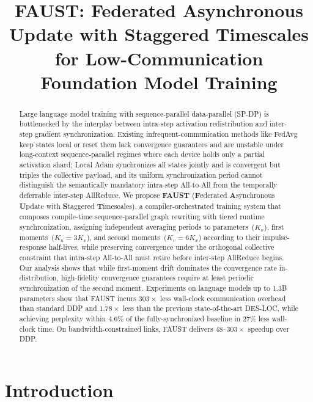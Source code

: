 \documentclass{article}
\title{FAUST: Federated Asynchronous Update with Staggered Timescales \\
for Low-Communication Foundation Model Training}
\author{}
\begin{document}
\maketitle

\begin{abstract}
Large language model training with sequence-parallel data-parallel (SP-DP) is bottlenecked by the interplay between intra-step activation redistribution and
inter-step gradient synchronization. Existing infrequent-communication methods like FedAvg keep states local or reset them lack convergence guarantees and
are unstable under long-context sequence-parallel regimes where each device holds only a partial activation shard; Local Adam synchronizes all states
jointly and is convergent but triples the collective payload, and its uniform synchronization period cannot distinguish the semantically mandatory intra-step All-to-All from the temporally deferrable inter-step AllReduce. We propose
\textbf{FAUST} (\textbf{F}ederated \textbf{A}synchronous \textbf{U}pdate with \textbf{S}taggered \textbf{T}imescales), a compiler-orchestrated training system that composes compile-time sequence-parallel graph rewriting with tiered runtime synchronization, assigning independent averaging periods to parameters~($K_x$), first moments~($K_u{=}3K_x$), and second moments~($K_v{=}6K_x$) according to their impulse-response half-lives, while preserving convergence under the orthogonal collective constraint that intra-step All-to-All must retire before inter-step AllReduce begins. Our analysis shows that while first-moment drift dominates the convergence rate
in-distribution, high-fidelity convergence guarantees require at least periodic
synchronization of the second moment. Experiments on language
models up to 1.3B parameters show that FAUST incurs $303{\times}$ less wall-clock communication overhead than standard DDP
and $1.78{\times}$ less than the previous state-of-the-art DES-LOC, while achieving perplexity within $4.6\%$ of the fully-synchronized baseline in $27\%$ less wall-clock time. On bandwidth-constrained links, FAUST delivers
$48$--$303{\times}$ speedup over DDP.
\end{abstract}


\section{Introduction}
\label{sec:introduction}
\end{document}
